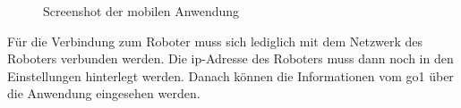 \begin{figure}[h]
    \caption{Screenshot der mobilen Anwendung}\label{fig:android}
\end{figure}

\noindent Für die Verbindung zum Roboter muss sich lediglich mit dem Netzwerk des Roboters verbunden werden.
Die \gls{ip}-Adresse des Roboters muss dann noch in den Einstellungen hinterlegt werden.
Danach können die Informationen vom \gls{go1} über die Anwendung eingesehen werden.
